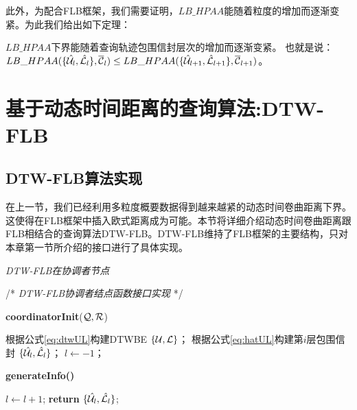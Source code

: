此外，为配合FLB框架，我们需要证明，$LB\_HPAA$能随着粒度的增加而逐渐变紧。为此我们给出如下定理：
\begin{theorem}\label{theo:DTWLbInc}
	$LB\_HPAA$下界能随着查询轨迹包围信封层次的增加而逐渐变紧。
	也就是说： $LB\_HPAA({  \{\hat{{\cal U}_{l}}, \hat{{\cal L}_{l}}\},\overline{{\cal C}}_{l}})\le  LB\_HPAA({  \{\hat{{\cal U}}_{l+1}, \hat{\cal L}_{l+1}\},\overline{\cal C}_{l+1}})$。
\end{theorem}



\section{基于动态时间距离的查询算法:DTW-FLB}\label{sec-c5-algorithm}
\subsection{DTW-FLB算法实现}
在上一节，我们已经利用多粒度概要数据得到越来越紧的动态时间卷曲距离下界。这使得在FLB框架中插入欧式距离成为可能。本节将详细介绍动态时间卷曲距离跟FLB相结合的查询算法DTW-FLB。DTW-FLB维持了FLB框架的主要结构，只对本章第一节所介绍的接口进行了具体实现。

\begin{algorithm}[t]
	\renewcommand{\baselinestretch}{1}
	\caption{{\sl DTW-FLB在协调者节点} \label{alg:DTWCor}}
	\begin{algorithmic}[2]
		\STATE /* \emph{DTW-FLB协调者结点函数接口实现} */
	\end{algorithmic}
	\textbf{coordinatorInit}(${\cal Q}, {\cal R}$)
	\begin{algorithmic}[1]
		\STATE 根据公式\ref{eq:dtwUL}构建DTWBE $\{{\cal U},{\cal L}\}$；
			 \STATE 根据公式\ref{eq:hatUL}构建第$i$层包围信封 $ \{\hat{{\cal U}_{l}}, \hat{{\cal L}_{l}}\}$；
		\ENDFOR 
		\STATE $l\leftarrow -1$；
	\end{algorithmic}
	\textbf{generateInfo()}
	\begin{algorithmic}[1]
		\STATE $l\leftarrow l+1$; 
		\STATE \textbf{return} $ \{\hat{{\cal U}_{l}}, \hat{{\cal L}_{l}}\}$;
	\end{algorithmic}
\end{algorithm}

